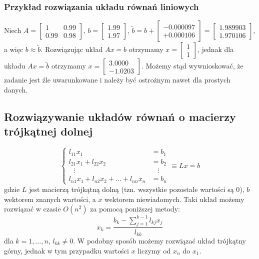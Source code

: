 \documentclass[a4paper,11pt]{article}
\begin{document}
\subsubsection{Przykład rozwiązania układu równań liniowych}
Niech 
$A= \left[ \begin{array}{cc} 1 & 0.99 \\ 0.99 & 0.98 \end{array} \right]$, $b = \left[ \begin{array}{c} 1.99 \\ 1.97 \end{array} \right]$, 
$\widetilde{b} = b +  \left[ \begin{array}{c} -0.000097 \\ +0.000106 \end{array} \right] = \left[ \begin{array}{c} 1.989903\\ 1.970106 \end{array} \right]$, a więc $b \approx \widetilde{b}$. Rozwiązując układ $Ax=b$ otrzymamy $x = \left[ \begin{array}{c} 1 \\ 1 \end{array} \right]$, jednak dla układu $Ax=\widetilde{b}$ otrzymamy $x = \left[ \begin{array}{c} 3.0000 \\ -1.0203 \end{array} \right]$. Możemy stąd wywnioskować, że zadanie jest źle uwarunkowane i należy być ostrożnym nawet dla prostych danych.

\subsection{Rozwiązywanie układów równań o macierzy trójkątnej dolnej}
$$
\left\{
\begin{array}{llll}
l_{11}x_{1}  &= b_1 \\
l_{21}x_{1}+l_{22}x_{2} &= b_2 \\
\ \ \ \vdots & \ \ \ \   \vdots \\
l_{n1}x_{1}+l_{n2}x_{2}+\dots+l_{nn}x_{n} &= b_n
\end{array}
\right.
\equiv Lx=b
$$
\noindent gdzie $L$ jest macierzą trójkątną dolną (tzn. wszystkie pozostałe wartości są $0$), $b$ wektorem znanych wartości, a $x$ wektorem niewiadomych. Taki układ możemy rozwiązać w czasie $O(n^2)$ za pomocą poniższej metody:
$$ x_k = \frac{b_k - \sum\limits_{j=1}^{k-1} l_{kj}x_j}{l_{kk}} $$
\noindent dla $k = 1, \ldots, n$, $l_{kk} \neq 0$. W podobny sposób możemy rozwiązać układ trójkątny górny, jednak w tym przypadku wartości $x$ liczymy od $x_n$ do $x_1$.
\end{document}
